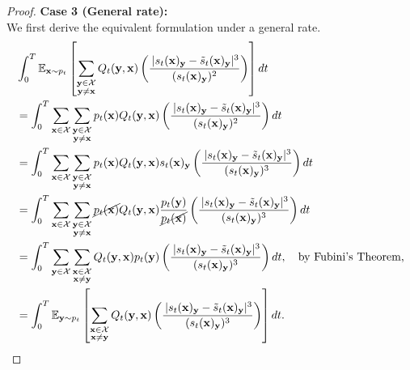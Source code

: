 \documentclass{article} %
\newcommand{\bfx}{{\bf x}}
\newcommand{\bfy}{ {\bf y}}
\begin{document}
\begin{proof}
        \textbf{Case 3 (General rate):} \\
    We first derive the equivalent formulation under a general rate.
    \begin{align*}
        & \int_0^T \mathbb{E}_{\bfx \sim p_t} \left[ \sum_{\substack{\bfy\in\mathcal{X} \\ \bfy\neq \bfx}}  Q_t(\bfy, \bfx) \left( \frac{\,|s_t(\bfx)_\bfy - \tilde{s}_t(\bfx)_\bfy|^3}{(s_t(\bfx)_\bfy)^2} \right) \right]  dt \\
        & = \int_0^T \sum_{\substack{\bfx\in\mathcal{X}}} \sum_{\substack{\bfy\in\mathcal{X} \\ \bfy\neq \bfx}} p_t(\bfx) Q_t(\bfy, \bfx) \left( \frac{\,|s_t(\bfx)_\bfy - \tilde{s}_t(\bfx)_\bfy|^3}{(s_t(\bfx)_\bfy)^2} \right) dt \\
         & = \int_0^T \sum_{\substack{\bfx\in\mathcal{X}}} \sum_{\substack{\bfy\in\mathcal{X} \\ \bfy\neq \bfx}} p_t(\bfx) Q_t(\bfy, \bfx) s_t(\bfx)_\bfy \left( \frac{\,|s_t(\bfx)_\bfy - \tilde{s}_t(\bfx)_\bfy|^3}{ (s_t(\bfx)_\bfy)^3} \right) dt \\
         & = \int_0^T \sum_{\substack{\bfx\in\mathcal{X}}} \sum_{\substack{\bfy\in\mathcal{X} \\ \bfy\neq \bfx}} \cancel{p_t(\bfx)} Q_t(\bfy, \bfx) \frac{p_t(\bfy)}{\cancel{p_t(\bfx)}} \left( \frac{\,|s_t(\bfx)_\bfy - \tilde{s}_t(\bfx)_\bfy|^3}{ (s_t(\bfx)_\bfy)^3} \right) dt \\
         & = \int_0^T \sum_{\substack{\bfy\in\mathcal{X}}} \sum_{\substack{\bfx\in\mathcal{X} \\ \bfx\neq \bfy}}  Q_t(\bfy, \bfx) {p_t(\bfy)} \left( \frac{\,|s_t(\bfx)_\bfy - \tilde{s}_t(\bfx)_\bfy|^3}{ (s_t(\bfx)_\bfy)^3} \right) dt, \quad \text{by Fubini's Theorem,}\\
         &= \int_0^T \mathbb{E}_{\bfy \sim p_t} \left[ \sum_{\substack{\bfx\in\mathcal{X} \\ \bfx\neq \bfy}}  Q_t(\bfy, \bfx)  \left( \frac{\,|s_t(\bfx)_\bfy - \tilde{s}_t(\bfx)_\bfy|^3}{ (s_t(\bfx)_\bfy)^3} \right) \right] dt.
    \end{align*}




\end{proof}
\end{document}
